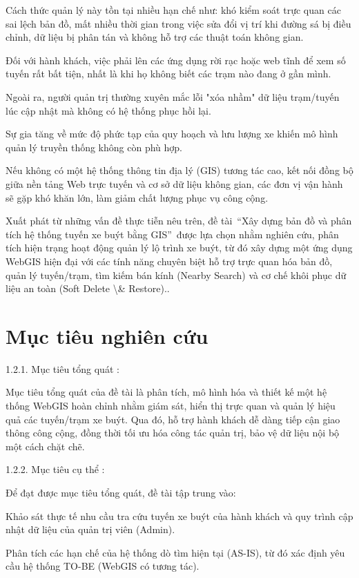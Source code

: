 \documentclass[13pt,a4paper]{report}
\begin{document}
Cách thức quản lý này tồn tại nhiều hạn chế như: khó kiểm soát trực quan các sai lệch bản đồ, mất nhiều thời gian trong việc sửa đổi vị trí khi đường sá bị điều chỉnh, dữ liệu bị phân tán và không hỗ trợ các thuật toán không gian.

Đối với hành khách, việc phải lên các ứng dụng rời rạc hoặc web tĩnh để xem số tuyến rất bất tiện, nhất là khi họ không biết các trạm nào đang ở gần mình.

Ngoài ra, người quản trị thường xuyên mắc lỗi "xóa nhầm" dữ liệu trạm/tuyến lúc cập nhật mà không có hệ thống phục hồi lại.

Sự gia tăng về mức độ phức tạp của quy hoạch và lưu lượng xe khiến mô hình quản lý truyền thống không còn phù hợp.

Nếu không có một hệ thống thông tin địa lý (GIS) tương tác cao, kết nối đồng bộ giữa nền tảng Web trực tuyến và cơ sở dữ liệu không gian, các đơn vị vận hành sẽ gặp khó khăn lớn, làm giảm chất lượng phục vụ công cộng.

Xuất phát từ những vấn đề thực tiễn nêu trên, đề tài “Xây dựng bản đồ và phân tích hệ thống tuyến xe buýt bằng GIS” được lựa chọn nhằm nghiên cứu, phân tích hiện trạng hoạt động quản lý lộ trình xe buýt, từ đó xây dựng một ứng dụng WebGIS hiện đại với các tính năng chuyên biệt hỗ trợ trực quan hóa bản đồ, quản lý tuyến/trạm, tìm kiếm bán kính (Nearby Search) và cơ chế khôi phục dữ liệu an toàn (Soft Delete \textbackslash{}& Restore)..

\section{Mục tiêu nghiên cứu}

1.2.1. Mục tiêu tổng quát :

Mục tiêu tổng quát của đề tài là phân tích, mô hình hóa và thiết kế một hệ thống WebGIS hoàn chỉnh nhằm giám sát, hiển thị trực quan và quản lý hiệu quả các tuyến/trạm xe buýt. Qua đó, hỗ trợ hành khách dễ dàng tiếp cận giao thông công cộng, đồng thời tối ưu hóa công tác quản trị, bảo vệ dữ liệu nội bộ một cách chặt chẽ.

1.2.2. Mục tiêu cụ thể :

Để đạt được mục tiêu tổng quát, đề tài tập trung vào:

Khảo sát thực tế nhu cầu tra cứu tuyến xe buýt của hành khách và quy trình cập nhật dữ liệu của quản trị viên (Admin).

Phân tích các hạn chế của hệ thống dò tìm hiện tại (AS-IS), từ đó xác định yêu cầu hệ thống TO-BE (WebGIS có tương tác).
\end{document}
